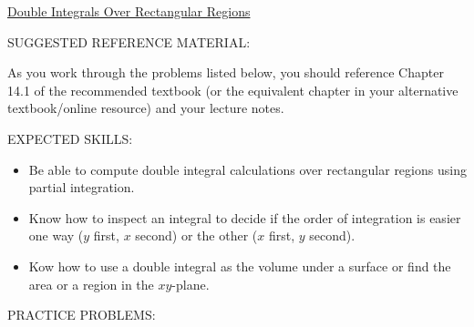 \documentclass[12pt]{article}
\begin{document}
\begin{center}
\underline{\LARGE{Double Integrals Over Rectangular Regions}}
\end{center}

\noindent SUGGESTED REFERENCE MATERIAL:

\bigskip

\noindent As you work through the problems listed below, you should reference Chapter 14.1 of the recommended textbook (or the equivalent chapter in your alternative textbook/online resource) and your lecture notes.

\bigskip

\noindent EXPECTED SKILLS:

\begin{itemize}

\item Be able to compute double integral calculations over rectangular regions using partial integration. 

\item Know how to inspect an integral to decide if the order of integration is easier one way ($y$ first, $x$ second) or the other ($x$ first, $y$ second). 

\item Kow how to use a double integral as the volume under a surface or find the area or a region in the $xy$-plane.

\end{itemize}

\noindent PRACTICE PROBLEMS:

\medskip

\end{document}

